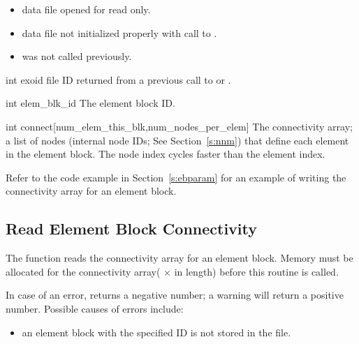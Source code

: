 \begin{itemize}
 \item data file opened for read only.

 \item data file not initialized properly with call to .

 \item {} was not called previously.
\end{itemize}


\begin{parameters}
\item[{int exoid \R{}}]
\exo{} file ID returned from a previous call to 
or .

\item[{int elem_blk_id \R{}}]
The element block ID.

\item[{int connect[num_elem_this_blk,num_nodes_per_elem] \R{}}]
The connectivity array; a list of nodes (internal node IDs;
See Section~\ref{s:nnm}) that define each element in the element
block. The node index cycles faster than the element index.
\end{parameters}

Refer to the code example in Section~\ref{s:ebparam} for an example of
writing the connectivity array for an element block.


\subsection{Read Element Block Connectivity}

The function  reads the connectivity array
for an element block. Memory must be allocated for the connectivity
array( $\times$  in length)
before this routine is called.

In case of an error,  returns a
negative number; a warning will return a positive number.
Possible causes of errors include:
\begin{itemize}
 \item an element block with the specified ID is not stored in the
 file.
\end{itemize}



